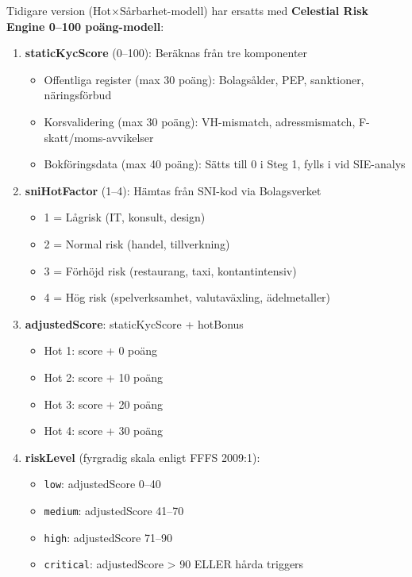 \documentclass[12pt,a4paper]{article}
\begin{document}
Tidigare version (Hot×Sårbarhet-modell) har ersatts med \textbf{Celestial Risk Engine 0–100 poäng-modell}:

\begin{enumerate}[noitemsep]
  \item \textbf{staticKycScore} (0–100): Beräknas från tre komponenter
    \begin{itemize}[noitemsep]
      \item Offentliga register (max 30 poäng): Bolagsålder, PEP, sanktioner, näringsförbud
      \item Korsvalidering (max 30 poäng): VH-mismatch, adressmismatch, F-skatt/moms-avvikelser
      \item Bokföringsdata (max 40 poäng): Sätts till 0 i Steg 1, fylls i vid SIE-analys
    \end{itemize}
  
  \item \textbf{sniHotFactor} (1–4): Hämtas från SNI-kod via Bolagsverket
    \begin{itemize}[noitemsep]
      \item 1 = Lågrisk (IT, konsult, design)
      \item 2 = Normal risk (handel, tillverkning)
      \item 3 = Förhöjd risk (restaurang, taxi, kontantintensiv)
      \item 4 = Hög risk (spelverksamhet, valutaväxling, ädelmetaller)
    \end{itemize}
  
  \item \textbf{adjustedScore}: staticKycScore + hotBonus
    \begin{itemize}[noitemsep]
      \item Hot 1: score + 0 poäng
      \item Hot 2: score + 10 poäng
      \item Hot 3: score + 20 poäng
      \item Hot 4: score + 30 poäng
    \end{itemize}
  
  \item \textbf{riskLevel} (fyrgradig skala enligt FFFS 2009:1):
    \begin{itemize}[noitemsep]
      \item \texttt{low}: adjustedScore 0–40
      \item \texttt{medium}: adjustedScore 41–70
      \item \texttt{high}: adjustedScore 71–90
      \item \texttt{critical}: adjustedScore > 90 ELLER hårda triggers
    \end{itemize}
  

\end{enumerate}
\end{document}
